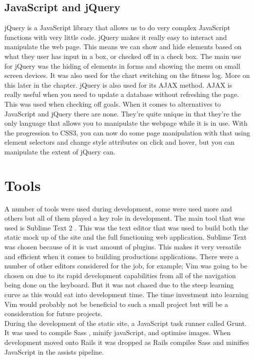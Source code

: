\subsection{JavaScript and jQuery}
jQuery is a JavaScript library that allows us to do very complex JavaScript functions with very little code. jQuery makes it really easy to interact and manipulate the web page. This means we can show and hide elements based on what they user has input in a box, or checked off in a check box. The main use for jQuery was the hiding of elements in forms and showing the menu on small screen devices. It was also used for the chart switching on the fitness log. More on this later in the chapter. jQuery is also used for its AJAX method. AJAX is really useful when you need to update a database without refreshing the page. This was used when checking off goals. When it comes to alternatives to JavaScript and jQuery there are none. They're quite unique in that they're the only language that allows you to manipulate the webpage while it is in use. With the progression to CSS3, you can now do some page manipulation with that using element selectors and change style attributes on click and hover, but you can manipulate the extent of jQuery can.

\section{Tools}
A number of tools were used during development, some were used more and others but all of them played a key role in development. The main tool that was used is Sublime Text 2 \citep{sublimetext:2011}. This was the text editor that was used to build both the static mock up of the site and the full functioning web application. Sublime Text was chosen because of it is vast amount of plugins. This makes it very versatile and efficient when it comes to building productions applications. There were a number of other editors considered for the job, for example; Vim \citep{vim:2013} was going to be chosen on due to its rapid development capabilities from all of the navigation being done on the keyboard. But it was not chased due to the steep learning curve as this would eat into development time. The time investment into learning Vim would probably not be beneficial to such a small project but will be a consideration for future projects.\\

During the development of the static site, a JavaScript task runner called Grunt. It was used to compile Sass \citep{sass:2006}, minify javaScript, and optimise images. When development moved onto Rails it was dropped as Rails compiles Sass and minifies JavaScript in the assists pipeline.\\


